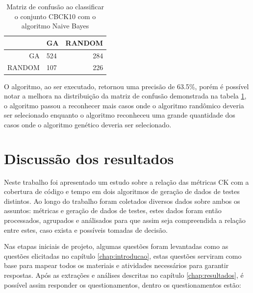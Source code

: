 \documentclass[
	12pt,				%
	oneside,			%
	a4paper,			%
	english,			%
	brazil				%
	]{abntex2ppgsi}
\begin{document}
\begin{table}[h]
\centering
\caption{Matriz de confusão ao classificar o conjunto CBCK10 com o algoritmo Naive Bayes}
\vspace{0.5cm}
\begin{tabular}{r|lr}

										
 & GA & RANDOM \\ %
\hline                               %
GA		& 524		& 284 \\
RANDOM		& 107		& 226
\end{tabular}
\label{table:confusao-hibrido-plus}
\end{table}

O algoritmo, ao ser executado, retornou uma precisão de 63.5\%, porém é possível notar a melhora na distribuição da matriz de confusão demonstrada na tabela \ref{table:confusao-hibrido-plus}, o algoritmo passou a reconhecer mais casos onde o algoritmo randômico deveria ser selecionado enquanto o algoritmo reconheceu uma grande quantidade dos casos onde o algoritmo genético deveria ser selecionado.




\section{Discussão dos resultados}
Neste trabalho foi apresentado um estudo sobre a relação das métricas CK com a cobertura de código e tempo em dois algoritmos de geração de dados de testes distintos.
Ao longo do trabalho foram coletados diversos dados sobre ambos os assuntos: métricas e geração de dados de testes, estes dados foram então processados, agrupados e análisados para que assim seja compreendida a relação entre estes, caso exista e possíveis tomadas de decisão.

Nas etapas iniciais de projeto, algumas questões foram levantadas como as questões elicitadas no capítulo \ref{chap:introducao}, estas questões serviram como base para mapear todos os materiais e atividades necessários para garantir respostas. Após as  extrações e análises  descritas no capítulo \ref{chap:resultados}, é possível assim responder os questionamentos, dentro os questionamentos estão:\\

\\
\end{document}
